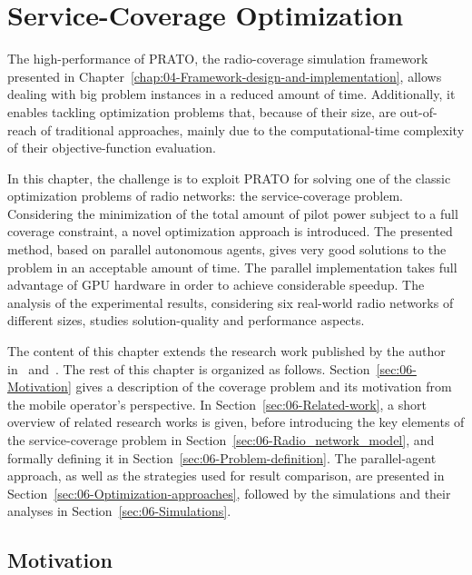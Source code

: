 
\chapter{Service-Coverage Optimization \label{chap:06-Experimental-evaluation-the-service-coverage-problem}}


\noindent The high-performance of PRATO, the radio-coverage simulation
framework presented in Chapter~\ref{chap:04-Framework-design-and-implementation},
allows dealing with big problem instances in a reduced amount of time.
Additionally, it enables tackling optimization problems that, because
of their size, are out-of-reach of traditional approaches, mainly
due to the computational-time complexity of their objective-function
evaluation.

In this chapter, the challenge is to exploit PRATO for solving one
of the classic optimization problems of radio networks: the service-coverage
problem. Considering the minimization of the total amount of pilot
power subject to a full coverage constraint, a novel optimization
approach is introduced. The presented method, based on parallel autonomous
agents, gives very good solutions to the problem in an acceptable
amount of time. The parallel implementation takes full advantage of
GPU hardware in order to achieve considerable speedup. The analysis
of the experimental results, considering six real-world radio networks
of different sizes, studies solution-quality and performance aspects.

The content of this chapter extends the research work published by
the author in~\cite{Benedicic_Pilot.power.optimization:2010} and~\cite{Benedicic-A_GPU_based_parallel_agent_optimization_approach:2013}.
The rest of this chapter is organized as follows. Section~\ref{sec:06-Motivation}
gives a description of the coverage problem and its motivation from
the mobile operator's perspective. In Section~\ref{sec:06-Related-work},
a short overview of related research works is given, before introducing
the key elements of the service-coverage problem in Section~\ref{sec:06-Radio_network_model},
and formally defining it in Section~\ref{sec:06-Problem-definition}.
The parallel-agent approach, as well as the strategies used for result
comparison, are presented in Section~\ref{sec:06-Optimization-approaches},
followed by the simulations and their analyses in Section~\ref{sec:06-Simulations}.


\section{Motivation \label{sec:06-Motivation}}

